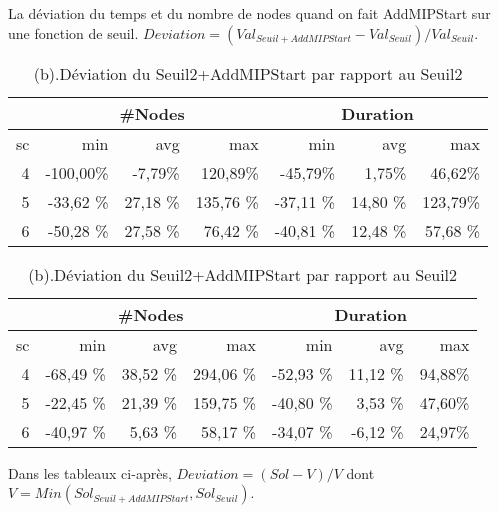 \documentclass[twoside,fleqn]{EPURapport}
\begin{document}
La déviation du temps et du nombre de nodes quand on fait AddMIPStart sur une fonction de seuil. $Deviation = (Val_{Seuil+AddMIPStart}-Val_{Seuil})/Val_{Seuil}$.
\clearpage
\begin{table}[h]
    \centering
    \begin{tabular}{|r|r|r|r|r|r|r|}
    	\hline
&\multicolumn{3}{c|}{\#Nodes} &\multicolumn{3}{c|}{Duration}	\\ \hline
sc&min	    &avg	    & max	  &min	    &avg	   & max \\ \hline
4 &-100,00\% &-7,79\% &120,89\% &-45,79\% &1,75\% &46,62\%  \\ \hline
5&-33,62	\%&27,18	\%&135,76 \%&	-37,11	\%&14,80	\%&123,79\%     \\ \hline
6&-50,28	\%&27,58	\%&76,42	\%&-40,81	\%&12,48	\%&57,68 \%     \\ \hline
    \end{tabular}
    \caption{(a).Déviation du Seuil1+AddMIPStart par rapport au Seuil1 }
    \label{tab_cut2_ams1_tab1}
    
    \begin{tabular}{|r|r|r|r|r|r|r|}
    	\hline
&\multicolumn{3}{c|}{\#Nodes} &\multicolumn{3}{c|}{Duration}	\\ \hline
sc&min	    &avg	    & max	  &min	    &avg	   & max \\ \hline
4&-68,49	\%&38,52	\%&294,06	\%&-52,93	\%&11,12	\%&94,88\%     \\ \hline
5&-22,45	\%&21,39	\%&159,75	\%&-40,80	\%&3,53	    \%&47,60\%     \\ \hline
6&-40,97	\%&5,63	    \%&58,17	\%&-34,07	\%&-6,12	\%&24,97\%     \\ \hline
    \end{tabular}
    \caption{(b).Déviation du Seuil2+AddMIPStart par rapport au Seuil2 }
    \label{tab_cut2_ams2_tab1}
\end{table}

Dans les tableaux ci-après, $Deviation = (Sol-V)/V$ dont $V =Min(Sol_{Seuil+AddMIPStart},Sol_{Seuil})$.
\end{document}

